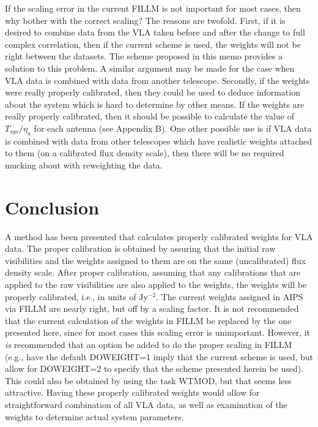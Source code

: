 \documentclass[11pt]{article}
\begin{document}
If the scaling error in the current FILLM is not important for most
cases, then why bother with the correct scaling?  The reasons are
twofold.  First, if it is desired to combine data from the VLA taken
before and after the change to full complex correlation, then if the
current scheme is used, the weights will not be right between the
datasets.  The scheme proposed in this memo provides a solution to this
problem.  A similar argument may be made for the case when VLA data is
combined with data from another telescope.  Secondly, if the weights
were really properly calibrated, then they could be used to deduce
information about the system which is hard to determine by other means.
If the weights are really properly calibrated, then it should be
possible to calculate the value of $T_{sys} / \eta_a$ for each antenna
(see Appendix B).  One other possible use is if VLA data is combined
with data from other telescopes which have realistic weights attached to
them (on a calibrated flux density scale), then there will be no
required mucking about with reweighting the data.

\section{Conclusion}

A method has been presented that calculates properly calibrated weights
for VLA data.  The proper calibration is obtained by assuring that the
initial raw visibilities and the weights assigned to them are on the
same (uncalibrated) flux density scale.  After proper calibration,
assuming that any calibrations that are applied to the raw visibilities
are also applied to the weights, the weights will be properly
calibrated, i.e., in units of Jy$^{-2}$.  The current weights assigned
in AIPS via FILLM are nearly right, but off by a scaling factor.  It is
not recommended that the current calculation of the weights in FILLM be
replaced by the one presented here, since for most cases this scaling
error is unimportant.  However, it {\it is} recommended that an option
be added to do the proper scaling in FILLM (e.g., have the default
DOWEIGHT=1 imply that the current scheme is used, but allow for
DOWEIGHT=2 to specify that the scheme presented herein be used).  This
could also be obtained by using the task WTMOD, but that seems less
attractive.  Having these properly calibrated weights would allow for
straightforward combination of all VLA data, as well as examination of
the weights to determine actual system parameters.
\end{document}
